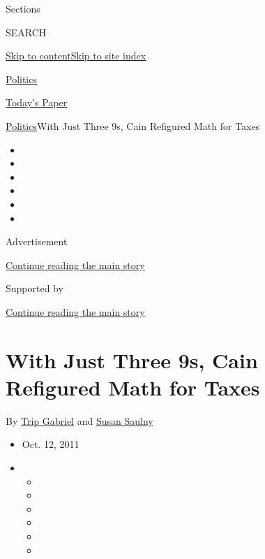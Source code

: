 Sections

SEARCH

\protect\hyperlink{site-content}{Skip to
content}\protect\hyperlink{site-index}{Skip to site index}

\href{https://www.nytimes.com/section/politics}{Politics}

\href{https://myaccount.nytimes.com/auth/login?response_type=cookie\&client_id=vi}{}

\href{https://www.nytimes.com/section/todayspaper}{Today's Paper}

\href{/section/politics}{Politics}\textbar{}With Just Three 9s, Cain
Refigured Math for Taxes

\begin{itemize}
\item
\item
\item
\item
\item
\item
\end{itemize}

Advertisement

\protect\hyperlink{after-top}{Continue reading the main story}

Supported by

\protect\hyperlink{after-sponsor}{Continue reading the main story}

\hypertarget{with-just-three-9s-cain-refigured-math-for-taxes}{%
\section{With Just Three 9s, Cain Refigured Math for
Taxes}\label{with-just-three-9s-cain-refigured-math-for-taxes}}

By \href{https://www.nytimes.com/by/trip-gabriel}{Trip Gabriel} and
\href{https://www.nytimes.com/by/susan-saulny}{Susan Saulny}

\begin{itemize}
\item
  Oct. 12, 2011
\item
  \begin{itemize}
  \item
  \item
  \item
  \item
  \item
  \item
  \end{itemize}
\end{itemize}


